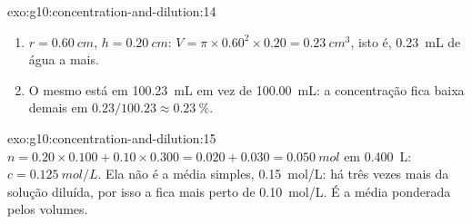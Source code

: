 \begin{solution}{exo:g10:concentration-and-dilution:14}
\begin{enumerate}
  \item $r = \qty{0.60}{cm}$, $h = \qty{0.20}{cm}$:
        $V = \pi \times 0.60^2 \times 0.20 = \qty{0.23}{cm^3}$, isto é,
        \qty{0.23}{mL} de água a mais.
  \item O mesmo  está em \qty{100.23}{mL} em vez de
        \qty{100.00}{mL}: a concentração fica baixa demais em
        $0.23 / 100.23 \approx
        \qty{0.23}{\percent}$.
\end{enumerate}
\end{solution}

\begin{solution}{exo:g10:concentration-and-dilution:15}
$n = 0.20 \times 0.100 + 0.10 \times 0.300 = 0.020 + 0.030 =
\qty{0.050}{mol}$ em \qty{0.400}{L}: $c = \qty{0.125}{mol/L}$. Ela não é
a média simples, \qty{0.15}{mol/L}: há três vezes mais da solução
diluída, por isso a  fica mais perto de \qty{0.10}{mol/L}. É a
média ponderada pelos volumes.
\end{solution}

